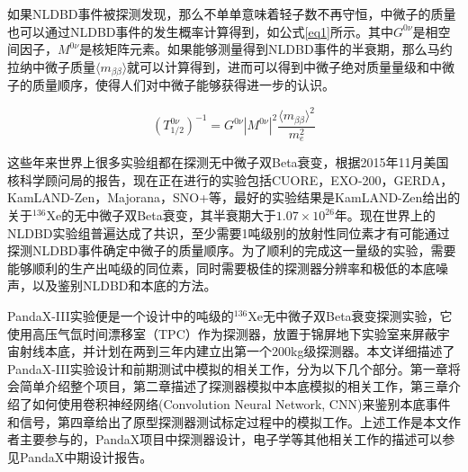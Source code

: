 如果NLDBD事件被探测发现，那么不单单意味着轻子数不再守恒，中微子的质量也可以通过NLDBD事件的发生概率计算得到，如公式\ref{eq1}所示\supercite{avignone2008double}。其中$G^{0\nu}$是相空间因子，$M^{0\nu}$是核矩阵元素。如果能够测量得到NLDBD事件的半衰期，那么马约拉纳中微子质量$\langle m_{\beta\beta}\rangle$就可以计算得到，进而可以得到中微子绝对质量量级和中微子的质量顺序，使得人们对中微子能够获得进一步的认识。

\begin{equation}
    (T_{1/2}^{0\nu})^{-1}=G^{0\nu}|M^{0\nu}|^2\frac{\langle m_{\beta\beta}\rangle ^2}{m_e^2}
    \label{eq1}
\end{equation}

这些年来世界上很多实验组都在探测无中微子双Beta衰变，根据2015年11月美国核科学顾问局的报告\supercite{NLDBD_NSAC}，现在正在进行的实验包括CUORE\supercite{Artusa:2014lgv}，EXO-200\supercite{Albert:2014awa}，GERDA\supercite{Agostini:2016iid}，KamLAND-Zen\supercite{KamLAND-Zen:2016pfg}，Majorana\supercite{Abgrall:2013rze}，SNO+\supercite{Andringa:2015tza}等，最好的实验结果是KamLAND-Zen给出的关于$^{136}$Xe的无中微子双Beta衰变，其半衰期大于$1.07\times10^26$年。现在世界上的NLDBD实验组普遍达成了共识，至少需要1吨级别的放射性同位素才有可能通过探测NLDBD事件确定中微子的质量顺序。为了顺利的完成这一量级的实验，需要能够顺利的生产出吨级的同位素，同时需要极佳的探测器分辨率和极低的本底噪声，以及鉴别NLDBD和本底的方法。

PandaX-III实验便是一个设计中的吨级的$^{136}$Xe无中微子双Beta衰变探测实验，它使用高压气氙时间漂移室（TPC）作为探测器，放置于锦屏地下实验室来屏蔽宇宙射线本底，并计划在两到三年内建立出第一个200kg级探测器。本文详细描述了PandaX-III实验设计和前期测试中模拟的相关工作，分为以下几个部分。第一章将会简单介绍整个项目，第二章描述了探测器模拟中本底模拟的相关工作，第三章介绍了如何使用卷积神经网络(Convolution Neural Network, CNN)来鉴别本底事件和信号，第四章给出了原型探测器测试标定过程中的模拟工作。上述工作是本文作者主要参与的，PandaX项目中探测器设计，电子学等其他相关工作的描述可以参见PandaX中期设计报告\supercite{chen2017pandax}。

